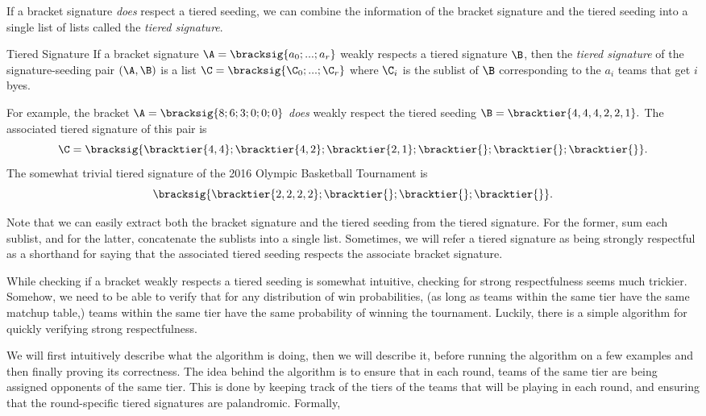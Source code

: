 {    

    If a bracket signature \textit{does} respect a tiered seeding, we can combine the information of the bracket signature and the tiered seeding into a single list of lists called the \textit{tiered signature}.

    \begin{definition}{Tiered Signature}{}
        If a bracket signature $\A = \bracksig{a_0; ...; a_r}$ weakly respects a tiered signature $\B$, then the \textit{tiered signature} of the signature-seeding pair $(\A, \B)$ is a list $\C = \bracksig{\C_0; ...; \C_r}$ where $\C_i$ is the sublist of $\B$ corresponding to the $a_i$ teams that get $i$ byes.
    \end{definition}

    For example, the bracket $\A = \bracksig{8;6;3;0;0;0}$ \textit{does} weakly respect the tiered seeding $\B = \bracktier{4,4,4,2,2,1}.$ The associated tiered signature of this pair is $$\C = \bracksig{\bracktier{4, 4};\bracktier{4,2};\bracktier{2,1};\bracktier{};\bracktier{};\bracktier{}}.$$ The somewhat trivial tiered signature of the 2016 Olympic Basketball Tournament is $$\bracksig{\bracktier{2, 2, 2, 2};\bracktier{};\bracktier{};\bracktier{}}.$$

    Note that we can easily extract both the bracket signature and the tiered seeding from the tiered signature. For the former, sum each sublist, and for the latter, concatenate the sublists into a single list. Sometimes, we will refer a tiered signature as being strongly respectful as a shorthand for saying that the associated tiered seeding respects the associate bracket signature.

    While checking if a bracket weakly respects a tiered seeding is somewhat intuitive, checking for strong respectfulness seems much trickier. Somehow, we need to be able to verify that for any distribution of win probabilities, (as long as teams within the same tier have the same matchup table,) teams within the same tier have the same probability of winning the tournament. Luckily, there is a simple algorithm for quickly verifying strong respectfulness.
    
    We will first intuitively describe what the algorithm is doing, then we will describe it, before running the algorithm on a few examples and then finally proving its correctness. The idea behind the algorithm is to ensure that in each round, teams of the same tier are being assigned opponents of the same tier. This is done by keeping track of the tiers of the teams that will be playing in each round, and ensuring that the round-specific tiered signatures are palandromic. Formally,

}
